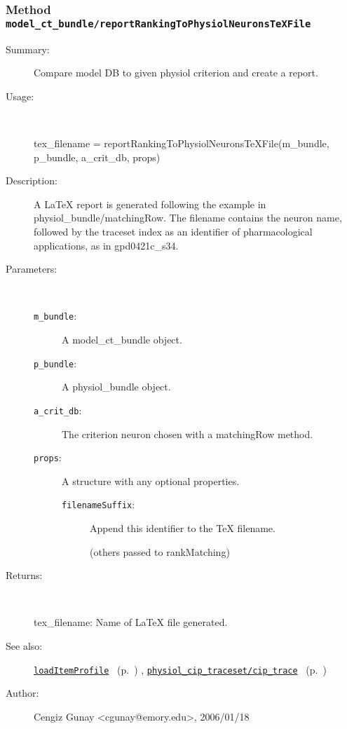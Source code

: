 \subsubsection[Method \texttt{reportRankingToPhysiolNeuronsTeXFile}]{Method \texttt{model\_ct\_bundle/reportRankingToPhysiolNeuronsTeXFile}}%
%
\label{ref_model_ct_bundle__reportRankingToPhysiolNeuronsTeXFile}%
\hypertarget{ref_model_ct_bundle__reportRankingToPhysiolNeuronsTeXFile}{}%
\begin{description}
\item[Summary:]Compare model DB to given physiol criterion and create a report.
%
\item[Usage:]~%
\begin{lyxcode}%
tex\_filename = reportRankingToPhysiolNeuronsTeXFile(m\_bundle, p\_bundle, a\_crit\_db, props)
%
\end{lyxcode}%
%
\item[Description:]%
A LaTeX report is generated 
 following the example in physiol\_bundle/matchingRow. The filename contains the neuron
 name, followed by the traceset index as an identifier of pharmacological applications,
 as in gpd0421c\_s34. 
\item[Parameters:]~
\begin{description}%
\item[\texttt{m\_bundle}:]
 A model\_ct\_bundle object.
\item[\texttt{p\_bundle}:]
 A physiol\_bundle object.
\item[\texttt{a\_crit\_db}:]
 The criterion neuron chosen with a matchingRow method.
\item[\texttt{props}:]
 A structure with any optional properties.
\begin{description}%
\item[\texttt{filenameSuffix}:]
 Append this identifier to the TeX filename.

(others passed to rankMatching)\end{description}%
\end{description}%
%
\item[Returns: ]~

	tex\_filename: Name of LaTeX file generated.
%
%
\item[See also:]%
\hyperlink{ref_loadItemProfile}{\texttt{loadItemProfile}}%
\ (p.~\pageref{ref_loadItemProfile})%
%
, \hyperlink{ref_physiol_cip_traceset__cip_trace}{\texttt{physiol\_cip\_traceset/cip\_trace}}%
\ (p.~\pageref{ref_physiol_cip_traceset__cip_trace})%
%
%
\item[Author:]%
Cengiz Gunay <cgunay@emory.edu>, 2006/01/18%
\end{description}
\methodline%
